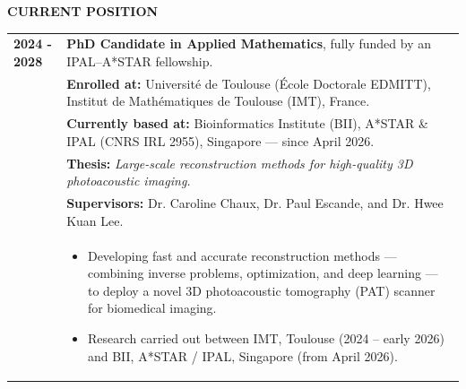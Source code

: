 \documentclass[a4paper,10pt]{article}
\begin{document}
\bigskip
\begin{center}\begin{large}
\textbf{CURRENT POSITION}
\end{large}\end{center}
\medskip
\begin{tabular}{p{2.2cm}p{13.8cm}}
    {\bf 2024 - 2028} & {\bf PhD Candidate in Applied Mathematics}, fully funded by an IPAL--A*STAR fellowship. \\
    & \textbf{Enrolled at:} Université de Toulouse (École Doctorale EDMITT), Institut de Mathématiques de Toulouse (IMT), France. \\
    & \textbf{Currently based at:} Bioinformatics Institute (BII), A*STAR \& IPAL (CNRS IRL 2955), Singapore — since April 2026. \\
    & \textbf{Thesis:} \emph{Large-scale reconstruction methods for high-quality 3D photoacoustic imaging.} \\
    & \textbf{Supervisors:} Dr. Caroline Chaux, Dr. Paul Escande, and Dr. Hwee Kuan Lee. \\
    & \begin{itemize}[leftmargin=*, noitemsep, topsep=2pt]
        \item Developing fast and accurate reconstruction methods --- combining inverse problems, optimization, and deep learning --- to deploy a novel 3D photoacoustic tomography (PAT) scanner for biomedical imaging.
        \item Research carried out between IMT, Toulouse (2024 -- early 2026) and BII, A*STAR / IPAL, Singapore (from April 2026).
      \end{itemize}
\end{tabular}
\end{document}
